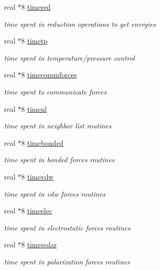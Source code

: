 \begin{DoxyCompactItemize}
real $\ast$8 \hyperlink{classtimestat_aa435182a301d010879aba033cbe89ac6}{timered}
\begin{DoxyCompactList}\small\item\em time spent in reduction operations to get energies \end{DoxyCompactList}\item 
real $\ast$8 \hyperlink{classtimestat_a0a3587a62bcc9c03959a5b90642c3fc6}{timetp}
\begin{DoxyCompactList}\small\item\em time spent in temperature/pressure control \end{DoxyCompactList}\item 
real $\ast$8 \hyperlink{classtimestat_a399092aecbb684c6c75d4cf3a229b338}{timecommforces}
\begin{DoxyCompactList}\small\item\em time spent to communicate forces \end{DoxyCompactList}\item 
real $\ast$8 \hyperlink{classtimestat_a4d04195176078e0328c8005fe8356a7b}{timenl}
\begin{DoxyCompactList}\small\item\em time spent in neighbor list routines \end{DoxyCompactList}\item 
real $\ast$8 \hyperlink{classtimestat_ae8564a39f5d612c7c0680539da171be3}{timebonded}
\begin{DoxyCompactList}\small\item\em time spent in bonded forces routines \end{DoxyCompactList}\item 
real $\ast$8 \hyperlink{classtimestat_a78ecc1df67b0a241c4dd8885dc25b6d2}{timevdw}
\begin{DoxyCompactList}\small\item\em time spent in vdw forces routines \end{DoxyCompactList}\item 
real $\ast$8 \hyperlink{classtimestat_a7a1804f574585aa42019ec284de7ec14}{timeelec}
\begin{DoxyCompactList}\small\item\em time spent in electrostatic forces routines \end{DoxyCompactList}\item 
real $\ast$8 \hyperlink{classtimestat_a745cff7d2b1bf3696c08cedec3d5c797}{timepolar}
\begin{DoxyCompactList}\small\item\em time spent in polarization forces routines \end{DoxyCompactList}\item 

\end{DoxyCompactItemize}
